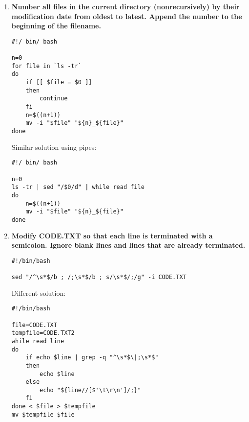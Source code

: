 \documentclass[12pt,a4paper]{article}
\begin{document}
\begin{enumerate}[label=\textbf{\arabic*}.]

\item \textbf{Number all files in the current directory (nonrecursively) by their modification date from oldest to latest. Append the number to the beginning of the filename.}

\begin{lstlisting}
#!/ bin/ bash

n=0
for file in `ls -tr`
do
	if [[ $file = $0 ]]
	then
		continue
	fi
	n=$((n+1))
	mv -i "$file" "${n}_${file}"
done
\end{lstlisting}

Similar solution using pipes:

\begin{lstlisting}
#!/ bin/ bash

n=0
ls -tr | sed "/$0/d" | while read file
do
	n=$((n+1))
	mv -i "$file" "${n}_${file}"
done
\end{lstlisting}


\item \textbf{Modify CODE.TXT so that each line is terminated with a semicolon. Ignore blank lines and lines that are already terminated.}

\begin{lstlisting}
#!/bin/bash

sed "/^\s*$/b ; /;\s*$/b ; s/\s*$/;/g" -i CODE.TXT
\end{lstlisting}

\clearpage

Different solution:

\begin{lstlisting}
#!/bin/bash

file=CODE.TXT
tempfile=CODE.TXT2
while read line
do
	if echo $line | grep -q "^\s*$\|;\s*$"
	then
		echo $line
	else
		echo "${line//[$'\t\r\n']/;}"
	fi
done < $file > $tempfile
mv $tempfile $file
\end{lstlisting}


\end{enumerate}
\end{document}
